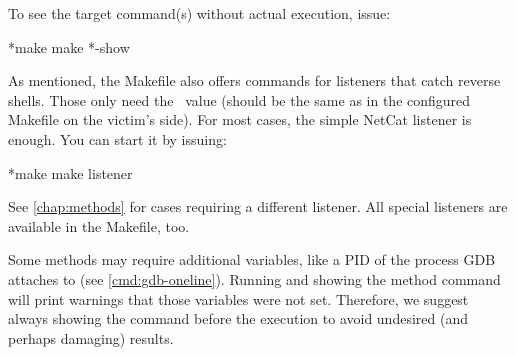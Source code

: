 To see the target command(s) without actual execution, issue:

\begin{cmdline}{*}{make}{}
make *\target*-show
\end{cmdline}

As mentioned, the Makefile also offers commands for listeners that catch reverse shells. Those only need the \port\ value (should be the same as in the configured Makefile on the victim's side). For most cases, the simple NetCat listener is enough. You can start it by issuing:

\begin{cmdline}{*}{make}{}
make listener
\end{cmdline}

See \cref{chap:methods} for cases requiring a different listener. All special listeners are available in the Makefile, too.

Some methods may require additional variables, like a PID of the process GDB attaches to (see \cref{cmd:gdb-oneline}). Running and showing the method command will print warnings that those variables were not set. Therefore, we suggest always showing the command before the execution to avoid undesired (and perhaps damaging) results.
